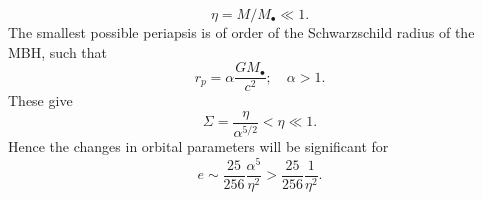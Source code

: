 \documentclass[useAMS,usedcolumn,usegraphicx,usenatbib]{mn2e}
\newcommand{\recip}[1]{\ensuremath{\frac{1}{#1}}}
\begin{document}
\begin{equation}
\eta = M/M_\bullet \ll 1.
\end{equation}
The smallest possible periapsis is of order of the Schwarzschild radius of the MBH, such that 
\begin{equation}
r_p = \alpha\frac{GM_\bullet}{c^2}; \quad \alpha > 1.
\end{equation}
These give
\begin{equation}
\Sigma = \frac{\eta}{\alpha^{5/2}} < \eta \ll 1.
\end{equation}
Hence the changes in orbital parameters will be significant for
\begin{equation}
e \sim \frac{25}{256}\frac{\alpha^5}{\eta^2} > \frac{25}{256}\recip{\eta^2}.
\end{equation}

\bsp

\label{lastpage}
\end{document}
